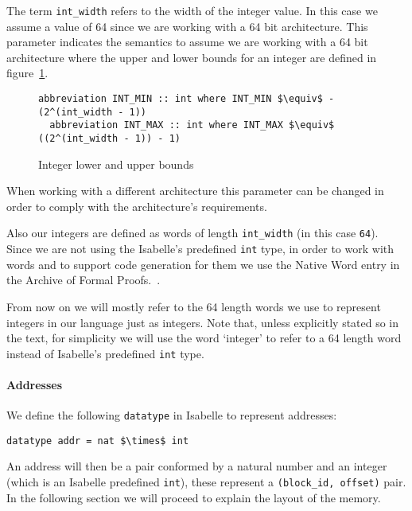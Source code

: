 The term \verb|int_width| refers to the width of the integer value.
In this case we assume a value of 64 since we are working with a 64 bit architecture.
This parameter indicates the semantics to assume we are working with a 64 bit architecture where the upper and lower bounds for an integer are defined in figure~\ref{fig:int_bounds}.

\begin{figure}
  \begin{lstlisting}[frame=single, mathescape=true]
  abbreviation INT_MIN :: int where INT_MIN $\equiv$ - (2^(int_width - 1))
  abbreviation INT_MAX :: int where INT_MAX $\equiv$  ((2^(int_width - 1)) - 1)
  \end{lstlisting}

  \caption{Integer lower and upper bounds}
  \label{fig:int_bounds}
\end{figure}

When working with a different architecture this parameter can be changed in order to comply with the architecture's requirements.

Also our integers are defined as words of length \verb|int_width| (in this case \verb|64|).
Since we are not using the Isabelle's predefined \verb|int| type, in order to work with words and to support code generation for them we use the Native Word entry in the Archive of Formal Proofs.~\parencite{Native_Word-AFP}.

From now on we will mostly refer to the 64 length words we use to represent integers in our language just as integers.
Note that, unless explicitly stated so in the text, for simplicity we will use the word `integer' to refer to a 64 length word instead of Isabelle's predefined \verb|int| type.

\paragraph{Addresses}

We define the following \verb|datatype| in Isabelle to represent addresses:

\begin{lstlisting}[frame=single, mathescape=true]
datatype addr = nat $\times$ int
\end{lstlisting}

An address will then be a pair conformed by a natural number and an integer (which is an Isabelle predefined \verb|int|), these represent a \verb|(block_id, offset)| pair.
In the following section we will proceed to explain the layout of the memory.

